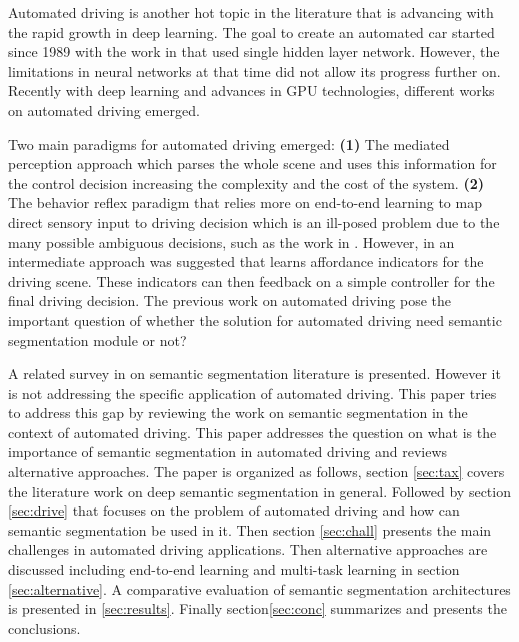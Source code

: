 \documentclass[conference]{IEEEtran}
\begin{document}
Automated driving is another hot topic in the literature that is advancing with the rapid growth in deep learning. The goal to create an automated car started since 1989 with the work in \cite{pomerleau1989alvinn} that used single hidden layer network. However, the limitations in neural networks at that time did not allow its progress further on. Recently with deep learning and advances in GPU technologies, different works on automated driving emerged. 

Two main paradigms for automated driving emerged: \textbf{(1)} The mediated perception approach which parses the whole scene and uses this information for the control decision increasing the complexity and the cost of the system. \textbf{(2)} The behavior reflex paradigm that relies more on end-to-end learning to map direct sensory input to driving decision which is an ill-posed problem due to the many possible ambiguous decisions, such as the work in \cite{bojarski2016end}\cite{muller2005off}. However, in \cite{chen2015deepdriving} an intermediate approach was suggested that learns affordance indicators for the driving scene. These indicators can then feedback on a simple controller for the final driving decision. The previous work on automated driving pose the important question of whether the solution for automated driving need semantic segmentation module or not? 

A related survey in \cite{zhu2016beyond} on semantic segmentation literature is presented. However it is not addressing the specific application of automated driving. This paper tries to address this gap by reviewing the work on semantic segmentation in the context of automated driving. This paper addresses the question on what is the importance of semantic segmentation in automated driving and reviews alternative approaches. The paper is organized as follows, section \ref{sec:tax} covers the literature work on deep semantic segmentation in general. Followed by section \ref{sec:drive} that focuses on the problem of automated driving and how can semantic segmentation be used in it. Then section \ref{sec:chall} presents the main challenges in automated driving applications. Then alternative approaches are discussed including end-to-end learning and multi-task learning in section \ref{sec:alternative}. A comparative evaluation of semantic segmentation architectures is presented in \ref{sec:results}. Finally section\ref{sec:conc} summarizes and presents the conclusions.
\end{document}

